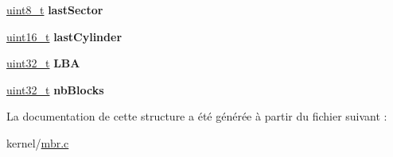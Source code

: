 \begin{DoxyCompactItemize}
\item 
\hypertarget{struct__PartitionDescriptor_a3630bb7241f436168573845c5f0fb51c}{\hyperlink{kernel_2include_2types_8h_aba7bc1797add20fe3efdf37ced1182c5}{uint8\-\_\-t} {\bfseries last\-Sector}}\label{struct__PartitionDescriptor_a3630bb7241f436168573845c5f0fb51c}

\item 
\hypertarget{struct__PartitionDescriptor_ae41ef6da9ade744a36f58a1e5ece36f7}{\hyperlink{kernel_2include_2types_8h_adf4d876453337156dde61095e1f20223}{uint16\-\_\-t} {\bfseries last\-Cylinder}}\label{struct__PartitionDescriptor_ae41ef6da9ade744a36f58a1e5ece36f7}

\item 
\hypertarget{struct__PartitionDescriptor_ae0a54b137da361739f30ce3a33f46379}{\hyperlink{kernel_2include_2types_8h_a33594304e786b158f3fb30289278f5af}{uint32\-\_\-t} {\bfseries L\-B\-A}}\label{struct__PartitionDescriptor_ae0a54b137da361739f30ce3a33f46379}

\item 
\hypertarget{struct__PartitionDescriptor_a48615506f84f0b810db3d15fbcbbfe2f}{\hyperlink{kernel_2include_2types_8h_a33594304e786b158f3fb30289278f5af}{uint32\-\_\-t} {\bfseries nb\-Blocks}}\label{struct__PartitionDescriptor_a48615506f84f0b810db3d15fbcbbfe2f}

\end{DoxyCompactItemize}


La documentation de cette structure a été générée à partir du fichier suivant \-:\begin{DoxyCompactItemize}
\item 
kernel/\hyperlink{mbr_8c}{mbr.\-c}\end{DoxyCompactItemize}
